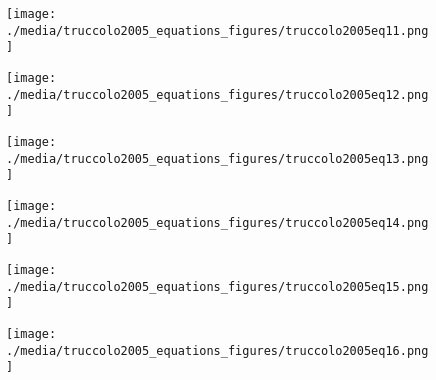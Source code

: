 \documentclass[svgnames,13pt]{beamer}
\begin{document}
\begin{frame}{}
\begin{figure}\centering\texttt{[image: ./media/truccolo2005\_equations\_figures/truccolo2005eq11.png]}\\\end{figure}
\end{frame} 

\begin{frame}{}
\begin{figure}\centering\texttt{[image: ./media/truccolo2005\_equations\_figures/truccolo2005eq12.png]}\\\end{figure}
\end{frame} 

\begin{frame}{}
\begin{figure}\centering\texttt{[image: ./media/truccolo2005\_equations\_figures/truccolo2005eq13.png]}\\\end{figure}
\end{frame} 

\begin{frame}{}
\begin{figure}\centering\texttt{[image: ./media/truccolo2005\_equations\_figures/truccolo2005eq14.png]}\\\end{figure}
\end{frame} 

\begin{frame}{}
\begin{figure}\centering\texttt{[image: ./media/truccolo2005\_equations\_figures/truccolo2005eq15.png]}\\\end{figure}
\end{frame} 

\begin{frame}{}
\begin{figure}\centering\texttt{[image: ./media/truccolo2005\_equations\_figures/truccolo2005eq16.png]}\\\end{figure}
\end{frame} 
\end{document}
